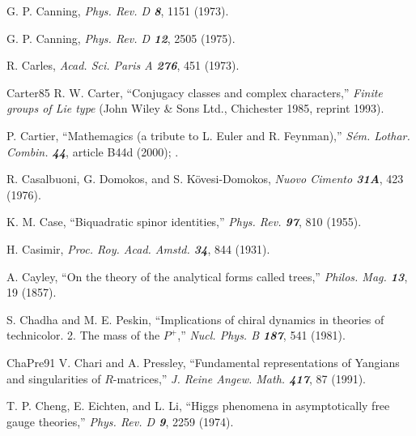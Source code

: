 G. P. Canning,
{\em Phys. Rev. D \bf 8}, 1151 (1973).

G. P. Canning,
{\em Phys. Rev.  D \bf 12}, 2505 (1975).


R. Carles,
{\em Acad. Sci. Paris  A \bf 276}, 451 (1973).

%
%
        {Carter85} R. W. Carter,
     ``Conjugacy classes and complex characters,''
     {\em Finite groups of {L}ie type}
     (John Wiley \& Sons Ltd., Chichester 1985, reprint 1993).

 P. Cartier,
    ``Mathemagics (a tribute to L. Euler and R. Feynman),''
    {\em S\'em. Lothar. Combin. \bf 44}, article B44d (2000);
     .

R. Casalbuoni, G. Domokos, and S. K{\"o}vesi-Domokos,
{\em Nuovo Cimento \bf 31A}, 423 (1976).

 K. M. Case,
``Biquadratic spinor identities,''
{\em Phys.  Rev.   \bf 97}, 810 (1955).

 H. Casimir,
{\em Proc.  Roy.  Acad. Amstd.  \bf 34}, 844 (1931).

 A. Cayley,
``On the theory of the analytical forms called trees,''
{\em Philos. Mag. \bf 13}, 19 (1857). %

 S. Chadha and M. E. Peskin,
``Implications of chiral dynamics in theories of technicolor. 2. The mass of
the $P^+$,''
{\em Nucl. Phys.  B \bf 187}, 541 (1981).

        {ChaPre91} V. Chari and A. Pressley,
``Fundamental representations of {Y}angians
  and singularities of {$R$}-matrices,''
{\em J. Reine Angew. Math. \bf 417}, 87 (1991). %

T. P. Cheng, E. Eichten, and L. Li,
``Higgs phenomena in asymptotically free gauge theories,''
{\em Phys.  Rev.    D \bf 9}, 2259 (1974).

